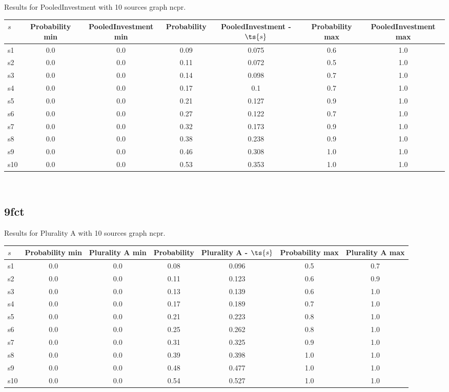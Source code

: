\documentclass{article}
\begin{document}
\noindent Results for PooledInvestment with 10 sources graph ncpr.

\noindent\begin{tabular}{|l|c|c|c|c|c|c|}
\hline
$s$& Probability min & PooledInvestment min & Probability & PooledInvestment - $\ts{s}$ & Probability max & PooledInvestment max\\
\hline
s1 &0.0 & 0.0 & 0.09 & 0.075 & 0.6 & 1.0\\
\hline
s2 &0.0 & 0.0 & 0.11 & 0.072 & 0.5 & 1.0\\
\hline
s3 &0.0 & 0.0 & 0.14 & 0.098 & 0.7 & 1.0\\
\hline
s4 &0.0 & 0.0 & 0.17 & 0.1 & 0.7 & 1.0\\
\hline
s5 &0.0 & 0.0 & 0.21 & 0.127 & 0.9 & 1.0\\
\hline
s6 &0.0 & 0.0 & 0.27 & 0.122 & 0.7 & 1.0\\
\hline
s7 &0.0 & 0.0 & 0.32 & 0.173 & 0.9 & 1.0\\
\hline
s8 &0.0 & 0.0 & 0.38 & 0.238 & 0.9 & 1.0\\
\hline
s9 &0.0 & 0.0 & 0.46 & 0.308 & 1.0 & 1.0\\
\hline
s10 &0.0 & 0.0 & 0.53 & 0.353 & 1.0 & 1.0\\
\hline
\end{tabular}\\

\newpage

\subsection{9fct}

\noindent Results for Plurality A with 10 sources graph ncpr.

\noindent\begin{tabular}{|l|c|c|c|c|c|c|}
\hline
$s$& Probability min & Plurality A min & Probability & Plurality A - $\ts{s}$ & Probability max & Plurality A max\\
\hline
s1 &0.0 & 0.0 & 0.08 & 0.096 & 0.5 & 0.7\\
\hline
s2 &0.0 & 0.0 & 0.11 & 0.123 & 0.6 & 0.9\\
\hline
s3 &0.0 & 0.0 & 0.13 & 0.139 & 0.6 & 1.0\\
\hline
s4 &0.0 & 0.0 & 0.17 & 0.189 & 0.7 & 1.0\\
\hline
s5 &0.0 & 0.0 & 0.21 & 0.223 & 0.8 & 1.0\\
\hline
s6 &0.0 & 0.0 & 0.25 & 0.262 & 0.8 & 1.0\\
\hline
s7 &0.0 & 0.0 & 0.31 & 0.325 & 0.9 & 1.0\\
\hline
s8 &0.0 & 0.0 & 0.39 & 0.398 & 1.0 & 1.0\\
\hline
s9 &0.0 & 0.0 & 0.48 & 0.477 & 1.0 & 1.0\\
\hline
s10 &0.0 & 0.0 & 0.54 & 0.527 & 1.0 & 1.0\\
\hline
\end{tabular}\\
\end{document}
